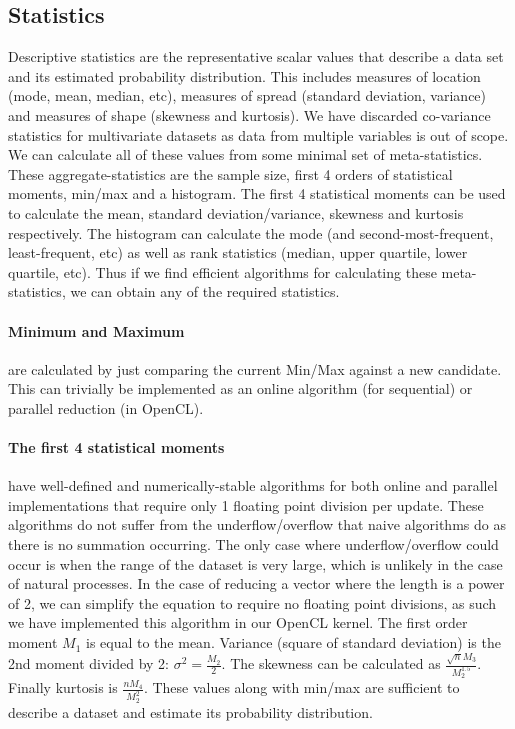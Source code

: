 \subsection{Statistics}
Descriptive statistics are the representative scalar values that describe a data set and its estimated probability distribution. This includes measures of location (mode, mean, median, etc), measures of spread (standard deviation, variance) and measures of shape (skewness and kurtosis). We have discarded co-variance statistics for multivariate datasets as data from multiple variables is out of scope. We can calculate all of these values from some minimal set of meta-statistics. These aggregate-statistics are the sample size, first 4 orders of statistical moments, min/max and a histogram. The first 4 statistical moments can be used to calculate the mean, standard deviation/variance, skewness and kurtosis respectively. The histogram can calculate the mode (and second-most-frequent, least-frequent, etc) as well as rank statistics (median, upper quartile, lower quartile, etc). Thus if we find efficient algorithms for calculating these meta-statistics, we can obtain any of the required statistics.

\paragraph{Minimum and Maximum}are calculated by just comparing the current Min/Max against a new candidate. This can trivially be implemented as an online algorithm (for sequential) or parallel reduction (in OpenCL).

\paragraph{The first 4 statistical moments}have well-defined and numerically-stable algorithms \cite{Pebay2008} for both online \cite{Choi2010} and parallel \cite{Chan1979} implementations that require only 1 floating point division per update. These algorithms do not suffer from the underflow/overflow that naive algorithms do as there is no summation occurring. The only case where underflow/overflow could occur is when the range of the dataset is very large, which is unlikely in the case of natural processes. In the case of reducing a vector where the length is a power of 2, we can simplify the equation to require no floating point divisions, as such we have implemented this algorithm in our OpenCL kernel. The first order moment $M_1$ is equal to the mean. Variance (square of standard deviation) is the 2nd moment divided by 2: $\sigma^2 = \frac{M_2}{2}$. The skewness can be calculated as $\frac{\sqrt{n}M_3}{M_2^1.5}$. Finally kurtosis is $\frac{nM_4}{M_2^2}$. These values along with min/max are sufficient to describe a dataset and estimate its probability distribution.

